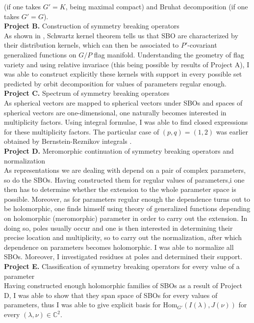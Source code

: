 \documentclass[11pt,a4paper,twoside]{jarticle}
\newcommand{\研究課題名}{Symmetry breaking operators}
\newcommand{\研究機関名}{東京大学}
\newcommand{\申請者氏名}{レオンチエフ\,オレクシィ}
\newcommand{\研究代表者氏名}{\申請者氏名}
\newcommand{\研究期間の最終元号年度}{31}	%
\begin{document}
{	(if one takes $G'=K$, being maximal compact) and Bruhat decomposition (if one takes $G'=G$).\\
	\textbf{Project B.} Construction of symmetry breaking operators\\
	As shown in \cite{KS15},
	Schwartz kernel theorem tells us that SBO are characterized by their distribution kernels,
	which can then be associated to $P'$-covariant generalized functions on $G/P$ flag manifold.
	Understanding the geometry of flag variety and using relative invariace (this being possible by results of Project A),
	I was able to construct explicitly these kernels with support in every possible set predicted by orbit decomposition for values of parameters regular enough.\\
	\textbf{Project C.} Spectrum of symmetry breaking operators \\
	As spherical vectors are mapped to spherical vectors under SBOs and spaces of spherical vectors are one-dimensional,
	one naturally becomes interested in multiplicity factors. Using integral formulae,
	I was able to find closed expressions for these multiplicity factors. The particular case of $(p,q)=(1,2)$ was earlier obtained by Bernstein-Reznikov integrals \cite{CKOP11}.\\
	\textbf{Project D.} Meromorphic continuation of symmetry breaking operators and normalization\\
	As representations we are dealing with depend on a pair of complex parameters, so do the SBOs. Having constructed them for regular values of parameters,i
	one then has to determine whether the extension to the whole parameter space is possible. Moreover, as for parameters regular enough the dependence turns out to be holomorphic,
	one finds himself using theory of generalized functions depending on holomorphic (meromorphic) parameter in order to carry out the extension. In doing so, poles usually occur and one is 
	then interested in determining their precise location and multiplicity, so to carry out the normalization, after which dependence on parameters becomes holomorphic. 
	I was able to normalize all SBOs. Moreover, I investigated residues at poles and determined their support.\\
	\textbf{Project E.} Classification of symmetry breaking operators for every value of a parameter\\
	Having constructed enough holomorphic families of SBOs as a result of Project D, I was able to show that they span space of SBOs for every values of parameters, thus I was able to
	give explicit basis for $\mbox{Hom}_{G'}(I\left( \lambda \right),J\left( \nu \right))$ for every $\left( \lambda,\nu \right)\in\mathbb{C}^2$.\\
}
\end{document}
